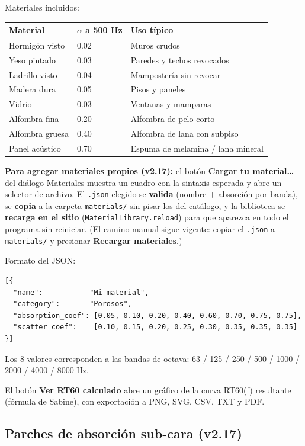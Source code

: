 \documentclass[11pt, a4paper]{article}
\newcommand{\menu}[1]{\textbf{\guillemotleft #1\guillemotright}}
\begin{document}
Materiales incluidos:

\begin{tabular}{lll}
  \toprule
  Material & $\alpha$ a 500 Hz & Uso típico \\
  \midrule
  Hormigón visto  & 0.02 & Muros crudos \\
  Yeso pintado    & 0.03 & Paredes y techos revocados \\
  Ladrillo visto  & 0.04 & Mampostería sin revocar \\
  Madera dura     & 0.05 & Pisos y paneles \\
  Vidrio          & 0.03 & Ventanas y mamparas \\
  Alfombra fina   & 0.20 & Alfombra de pelo corto \\
  Alfombra gruesa & 0.40 & Alfombra de lana con subpiso \\
  Panel acústico  & 0.70 & Espuma de melamina / lana mineral \\
  \bottomrule
\end{tabular}

\textbf{Para agregar materiales propios (v2.17):} el botón
\menu{Cargar tu material\ldots} del diálogo Materiales muestra un cuadro con la
sintaxis esperada y abre un selector de archivo. El \texttt{.json} elegido se
\textbf{valida} (nombre $+$ absorción por banda), se \textbf{copia} a la carpeta
\texttt{materials/} sin pisar los del catálogo, y la biblioteca se \textbf{recarga
en el sitio} (\texttt{MaterialLibrary.reload}) para que aparezca en todo el
programa sin reiniciar. (El camino manual sigue vigente: copiar el
\texttt{.json} a \texttt{materials/} y presionar \menu{Recargar materiales}.)

Formato del JSON:
\begin{verbatim}
[{
  "name":           "Mi material",
  "category":       "Porosos",
  "absorption_coef": [0.05, 0.10, 0.20, 0.40, 0.60, 0.70, 0.75, 0.75],
  "scatter_coef":    [0.10, 0.15, 0.20, 0.25, 0.30, 0.35, 0.35, 0.35]
}]
\end{verbatim}

Los 8 valores corresponden a las bandas de octava:
63 / 125 / 250 / 500 / 1000 / 2000 / 4000 / 8000 Hz.

El botón \menu{Ver RT60 calculado} abre un gráfico de la curva RT60(f)
resultante (fórmula de Sabine), con exportación a PNG, SVG, CSV, TXT y PDF.

\subsection{Parches de absorción sub-cara (v2.17)}
\end{document}
